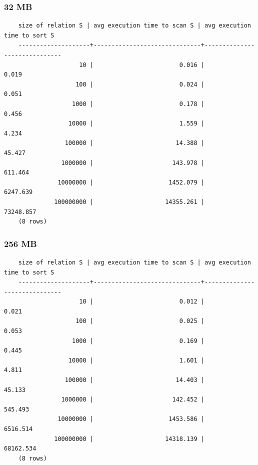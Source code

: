 \documentclass{article}
\begin{document}
  \subsubsection*{32 MB}
  \begin{verbatim}
    size of relation S | avg execution time to scan S | avg execution time to sort S 
    --------------------+------------------------------+------------------------------
                     10 |                        0.016 |                        0.019
                    100 |                        0.024 |                        0.051
                   1000 |                        0.178 |                        0.456
                  10000 |                        1.559 |                        4.234
                 100000 |                       14.388 |                       45.427
                1000000 |                      143.978 |                      611.464
               10000000 |                     1452.079 |                     6247.639
              100000000 |                    14355.261 |                    73248.857
    (8 rows)
  \end{verbatim}
  \subsubsection*{256 MB}
  \begin{verbatim}
    size of relation S | avg execution time to scan S | avg execution time to sort S 
    --------------------+------------------------------+------------------------------
                     10 |                        0.012 |                        0.021
                    100 |                        0.025 |                        0.053
                   1000 |                        0.169 |                        0.445
                  10000 |                        1.601 |                        4.811
                 100000 |                       14.403 |                       45.133
                1000000 |                      142.452 |                      545.493
               10000000 |                     1453.586 |                     6516.514
              100000000 |                    14318.139 |                    68162.534
    (8 rows)
    
  \end{verbatim}
\end{document}
